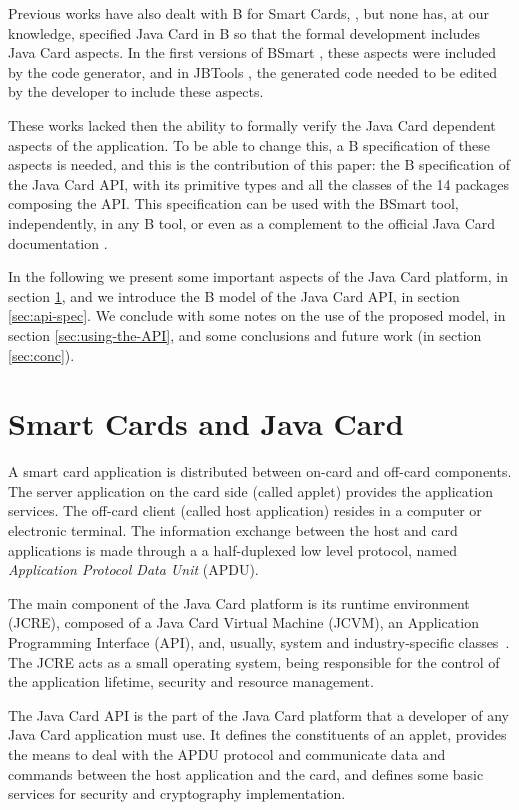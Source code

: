 \documentclass{entcs}
\begin{document}
Previous works have also dealt with B for Smart Cards,
\cite{Bert:2003,JBtools,tatibouet:lncs,requetBtoC}, but none has, at
our knowledge, specified Java Card in B so that the formal development
includes Java Card aspects. In the first versions of BSmart
\cite{Gomes10}, these aspects were included by the code generator, and
in JBTools \cite{JBtools}, the generated code needed to be edited by
the developer to include these aspects.

These works lacked then the ability to formally verify the Java Card
dependent aspects of the application. To be able to change this, a B
specification of these aspects is needed, and this is the contribution
of this paper: the B specification of the Java Card API, with its
primitive types and all the classes of the 14 packages composing the
API. This specification can be used with the BSmart tool, 
independently, in any B tool, or even as a complement to the official
Java Card documentation \cite{oracle}.

In the following we present some important aspects of the Java Card platform, in section \ref{sec:javacard}, and we introduce the B model of the Java Card API,  in section \ref{sec:api-spec}. We conclude with some notes on the use of the proposed model, in section \ref{sec:using-the-API}, and some conclusions and future work (in section \ref{sec:conc}).


\section{Smart Cards and Java Card}\label{sec:javacard}

A smart card application is distributed between on-card and off-card
components.  The server application on the card side (called applet)
provides the application services. The off-card client (called host
application) resides in a computer or electronic terminal. The information 
exchange between the host and card applications is
made through a a half-duplexed low level protocol, named
\emph{Application Protocol Data Unit} (APDU).  

The main component of the Java Card platform
is its runtime environment (JCRE), composed of a Java Card Virtual
Machine (JCVM), an Application Programming Interface (API), and, usually, system and
industry-specific classes~\cite{chen:2000}. The JCRE acts as a small
operating system, being responsible for the control of the application
lifetime, security and resource management.

The Java Card API is the part of the Java Card platform that a developer of any Java Card application must use. It defines the constituents of an applet, provides the means to deal with the APDU protocol and communicate data and commands between the host application and the card, and defines some basic services for security and cryptography implementation. 
\end{document}
